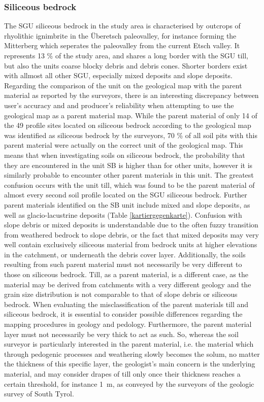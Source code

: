 \documentclass[preprint,12pt,authoryear]{elsarticle}
\begin{document}
\subsubsection{Siliceous bedrock}
The SGU siliceous bedrock in the study area is characterised by outcrops of rhyolithic ignimbrite in the {\"U}beretsch paleovalley, for instance forming the Mitterberg which seperates the paleovalley from the current Etsch valley. It represents 13 \% of the study area, and shares a long border with the SGU till, but also the units coarse blocky debris and debris cones. Shorter borders exist with allmost all other SGU, especially mixed deposits and slope deposits. Regarding the comparison of the unit on the geological map with the parent material as reported by the surveyors, there is an interesting discrepancy between user's accuracy and and producer's reliability when attempting to use the geological map as a parent material map. While the parent material of only 14 of the 49 profile sites located on siliceous bedrock according to the geological map was identified as siliceous bedrock by the surveyors, 70 \% of all soil pits with this parent material were actually on the correct unit of the geological map. This means that when investigating soils on siliceous bedrock, the probability that they are encountered in the unit SB is higher than for other units, however it is similarly probable to encounter other parent materials in this unit. The greatest confusion occurs with the unit till, which was found to be the parent material of almost every second soil profile located on the SGU siliceous bedrock. Further parent materials identified on the SB unit include mixed and slope deposits, as well as glacio-lacustrine deposits (Table \ref{kartiergegenkarte}). Confusion with slope debris or mixed deposits is understandable due to the often fuzzy transition from  weathered bedrock to slope debris, or the fact that mixed deposits may very well contain exclusively siliceous material from bedrock units at higher elevations in the catchment, or underneath the debris cover layer. Additionally, the soils resulting from such parent material must not necessarily be very different to those on siliceous bedrock. Till, as a parent material, is a different case, as the material may be derived from catchments with a very different geology and the grain  size distribution is not comparable to that of slope debris or siliceous bedrock. When evaluating the misclassification of the parent materials till and siliceous bedrock, it is essential to consider possible differences regarding the  mapping procedures in geology and pedology. Furthermore, the parent material layer must not necessarily be very thick to act as such. So, whereas the soil surveyor is particularly interested in the parent material, i.e. the material which through  pedogenic processes and weathering slowly becomes the solum, no matter the thickness of this specific layer, the geologist's main concern is the underlying material, and may consider drapes of till only once their thickness reaches a certain threshold, for instance 1~m, as conveyed by the surveyors of the geologic survey of South Tyrol.
\end{document}
